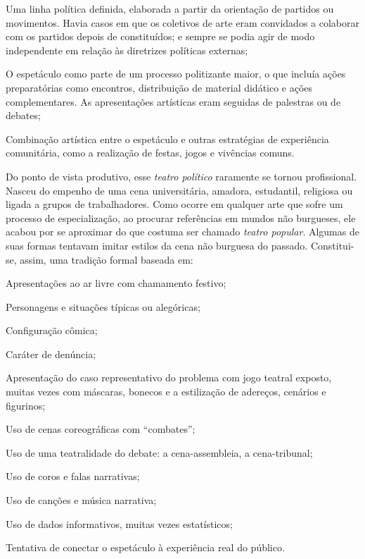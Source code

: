 \startitemize[n,packed]
\item
  Uma linha política definida, elaborada a partir da orientação de
  partidos ou movimentos. Havia casos em que os coletivos de arte eram
  convidados a colaborar com os partidos depois de constituídos; e
  sempre se podia agir de modo independente em relação às diretrizes
  políticas externas;
\item
  O espetáculo como parte de um processo politizante maior, o que
  incluía ações preparatórias como encontros, distribuição de material
  didático e ações complementares. As apresentações artísticas eram
  seguidas de palestras ou de debates;
\item
  Combinação artística entre o espetáculo e outras estratégias de
  experiência comunitária, como a realização de festas, jogos e vivências
  comuns.
\stopitemize

Do ponto de vista produtivo, esse {\it teatro político} raramente se
tornou profissional. Nasceu do empenho de uma cena universitária,
amadora, estudantil, religiosa ou ligada a grupos de trabalhadores. Como
ocorre em qualquer arte que sofre um processo de especialização, ao
procurar referências em mundos não burgueses, ele acabou por se
aproximar do que costuma ser chamado {\it teatro popular}. Algumas de
suas formas tentavam imitar estilos da cena não burguesa do passado.
Constitui-se, assim, uma tradição formal baseada em:

\startitemize[n,packed]
\item
  Apresentações ao ar livre com chamamento festivo;
\item
  Personagens e situações típicas ou alegóricas;
\item
  Configuração cômica;
\item
  Caráter de denúncia;
\item
  Apresentação do caso representativo do problema com jogo teatral
  exposto, muitas vezes com máscaras, bonecos e a estilização de adereços,
  cenários e figurinos;
\item
  Uso de cenas coreográficas com “combates”;
\item
  Uso de uma teatralidade do debate: a cena-assembleia, a cena-tribunal;
\item
  Uso de coros e falas narrativas;
\item
  Uso de canções e música narrativa;
\item
  Uso de dados informativos, muitas vezes estatísticos;
\item
  Tentativa de conectar o espetáculo à experiência real do público.
\stopitemize

